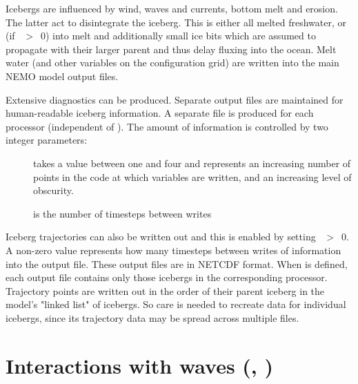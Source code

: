 \documentclass[../tex_main/NEMO_manual]{subfiles}
\begin{document}
Icebergs are influenced by wind, waves and currents, bottom melt and erosion.
The latter act to disintegrate the iceberg.
This is either all melted freshwater,
or (if ~$>$~0) into melt and additionally small ice bits
which are assumed to propagate with their larger parent and thus delay fluxing into the ocean.
Melt water (and other variables on the configuration grid) are written into the main NEMO model output files.

Extensive diagnostics can be produced.
Separate output files are maintained for human-readable iceberg information.
A separate file is produced for each processor (independent of ).
The amount of information is controlled by two integer parameters:
\begin{description}
\item[] takes a value between one and four and
  represents an increasing number of points in the code at which variables are written,
  and an increasing level of obscurity.
\item[] is the number of timesteps between writes
\end{description}

Iceberg trajectories can also be written out and this is enabled by setting ~$>$~0.
A non-zero value represents how many timesteps between writes of information into the output file.
These output files are in NETCDF format.
When  is defined, each output file contains only those icebergs in the corresponding processor.
Trajectory points are written out in the order of their parent iceberg in the model's "linked list" of icebergs.
So care is needed to recreate data for individual icebergs,
since its trajectory data may be spread across multiple files.

\section{Interactions with waves (\protect{}, \protect{})}
\label{sec:SBC_wave}

\end{document}

